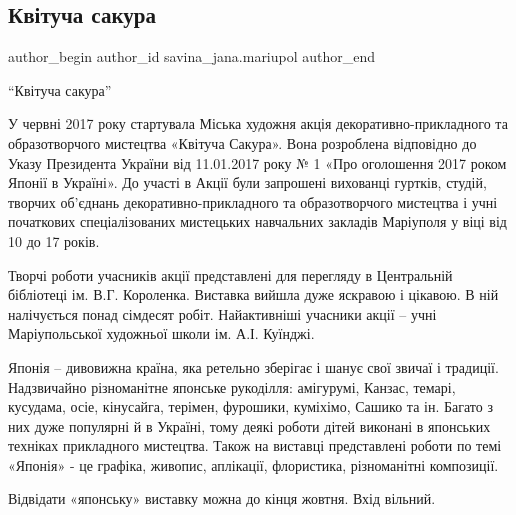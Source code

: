  
 
 
 
 

\subsection{Квітуча сакура}
\label{sec:19_10_2017.fb.savina_jana.mariupol.1.kv_tucha_sakura}

\ifcmt
 author_begin
   author_id savina_jana.mariupol
 author_end
\fi

\enquote{Квітуча сакура}

У червні 2017 року стартувала Міська художня акція декоративно-прикладного та
образотворчого мистецтва «Квітуча Сакура». Вона розроблена відповідно до Указу
Президента України від 11.01.2017 року № 1 «Про оголошення 2017 роком Японії в
Україні». До участі в Акції були запрошені вихованці гуртків, студій, творчих
об'єднань декоративно-прикладного та образотворчого мистецтва і учні початкових
спеціалізованих мистецьких навчальних закладів Маріуполя у віці від 10 до 17
років.

Творчі роботи учасників акції представлені для перегляду в Центральній
бібліотеці ім. В.Г. Короленка. Виставка вийшла дуже яскравою і цікавою. В ній
налічується понад сімдесят робіт. Найактивніші учасники акції – учні
Маріупольської художньої школи ім. А.І. Куїнджі.

Японія – дивовижна країна, яка ретельно зберігає і шанує свої звичаї і
традиції. Надзвичайно різноманітне японське рукоділля: амігурумі, Канзас,
темарі, кусудама, осіе, кінусайга, терімен, фурошики, куміхімо, Сашико та ін.
Багато з них дуже популярні й в Україні, тому деякі роботи дітей виконані в
японських техніках прикладного мистецтва. Також на виставці представлені роботи
по темі «Японія» - це графіка, живопис, аплікації, флористика, різноманітні
композиції.

Відвідати «японську» виставку можна до кінця жовтня. Вхід вільний.

